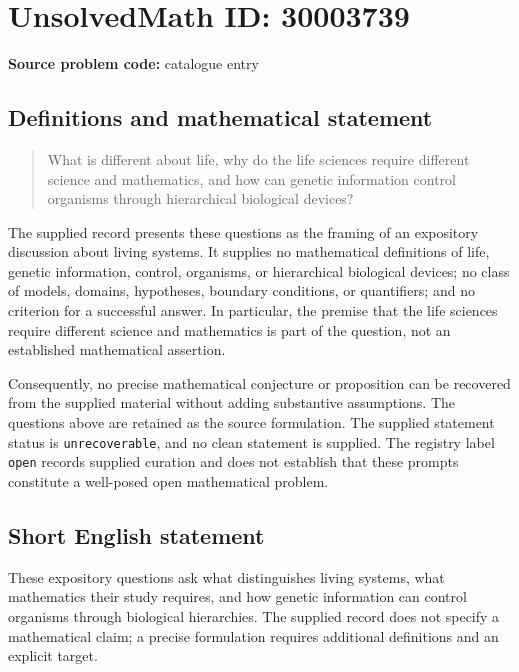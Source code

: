 \documentclass[11pt]{article}
\begin{document}
\section*{UnsolvedMath ID: 30003739}
\textbf{Source problem code:} catalogue entry
\subsection{Definitions and mathematical statement}
\begin{quote}
What is different about life, why do the life sciences require different science and mathematics, and how can genetic information control organisms through hierarchical biological devices?
\end{quote}
The supplied record presents these questions as the framing of an expository discussion about living systems. It supplies no mathematical definitions of life, genetic information, control, organisms, or hierarchical biological devices; no class of models, domains, hypotheses, boundary conditions, or quantifiers; and no criterion for a successful answer. In particular, the premise that the life sciences require different science and mathematics is part of the question, not an established mathematical assertion.

Consequently, no precise mathematical conjecture or proposition can be recovered from the supplied material without adding substantive assumptions. The questions above are retained as the source formulation. The supplied statement status is \texttt{unrecoverable}, and no clean statement is supplied. The registry label \texttt{open} records supplied curation and does not establish that these prompts constitute a well-posed open mathematical problem.
\subsection{Short English statement}
These expository questions ask what distinguishes living systems, what mathematics their study requires, and how genetic information can control organisms through biological hierarchies. The supplied record does not specify a mathematical claim; a precise formulation requires additional definitions and an explicit target.
\end{document}

